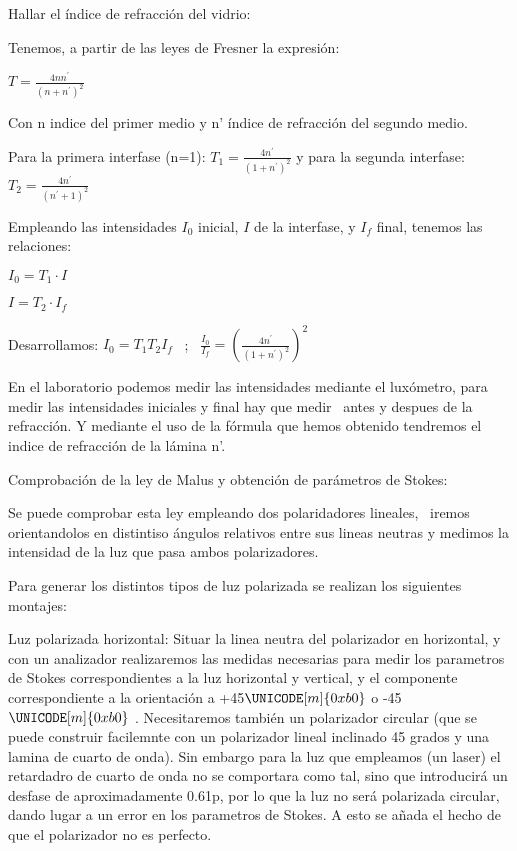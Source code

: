 \documentclass[12pt,thmsa]{article}
\begin{document}
\vspace{1pt}

Hallar el \'{i}ndice de refracci\'{o}n del vidrio:

Tenemos, a partir de las leyes de Fresner la expresi\'{o}n:

$T=\frac{4nn^{\prime }}{(n+n^{\prime })^{2}}$

Con n indice del primer medio y n' \'{i}ndice de refracci\'{o}n del segundo
medio.

Para la primera interfase (n=1): $T_{1}=\frac{4n^{\prime }}{(1+n^{\prime
})^{2}}$ y para la segunda interfase: $T_{2}=\frac{4n^{\prime }}{(n^{\prime
}+1)^{2}}$

Empleando las intensidades $I_{0}$ inicial, $I$ de la interfase, y $I_{f}$
final, tenemos las relaciones:

$I_{0}=T_{1}\cdot I$

$I=T_{2}\cdot I_{f}$

Desarrollamos: $I_{0}=T_{1}T_{2}I_{f}$ \ ; \ $\frac{I_{0}}{I_{f}}=\left( 
\frac{4n^{\prime }}{(1+n^{\prime })^{2}}\right) ^{2}$

En el laboratorio podemos medir las intensidades mediante el lux\'{o}metro,
para medir las intensidades iniciales y final hay que medir \ antes y
despues de la refracci\'{o}n. Y mediante el uso de la f\'{o}rmula que hemos
obtenido tendremos el indice de refracci\'{o}n de la l\'{a}mina n'.

\vspace{1pt}

Comprobaci\'{o}n de la ley de Malus y obtenci\'{o}n de par\'{a}metros de
Stokes:

Se puede comprobar esta ley empleando dos polaridadores lineales, \ iremos
orientandolos en distintiso \'{a}ngulos relativos entre sus lineas neutras y
medimos la intensidad de la luz que pasa ambos polarizadores.

Para generar los distintos tipos de luz polarizada se realizan los
siguientes montajes:

Luz polarizada horizontal: Situar la linea neutra del polarizador en
horizontal, y con un analizador realizaremos las medidas necesarias para
medir los parametros de Stokes correspondientes a la luz horizontal y
vertical, y el componente correspondiente a la orientaci\'{o}n a +45$%
\UNICODE[m]{0xb0}$ o -45$\UNICODE[m]{0xb0}$ . Necesitaremos tambi\'{e}n un
polarizador circular (que se puede construir facilemnte con un polarizador
lineal inclinado 45 grados y una lamina de cuarto de onda). Sin embargo para
la luz que empleamos (un laser) el retardadro de cuarto de onda no se
comportara como tal, sino que introducir\'{a} un desfase de aproximadamente
0.61p, por lo que la luz no ser\'{a} polarizada circular, dando lugar a un
error en los parametros de Stokes. A esto se a\~{n}ada el hecho de que el
polarizador no es perfecto.
\end{document}
